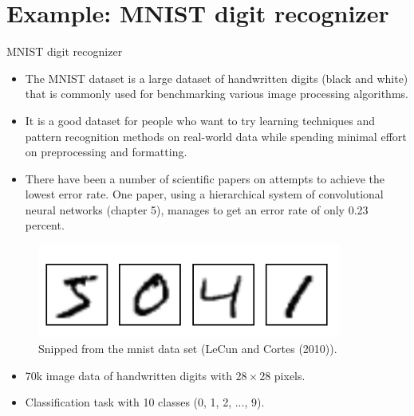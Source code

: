 \section{Example: MNIST digit recognizer}
\begin{vbframe}{MNIST digit recognizer}
  \begin{itemize}
    \item The MNIST dataset is a large dataset of handwritten digits (black and white) that is commonly used for benchmarking various image processing algorithms.
    \item It is a good dataset for people who want to try learning techniques and pattern recognition methods on real-world data while spending minimal effort on preprocessing and formatting.
    \item  There have been a number of scientific papers on attempts to achieve the lowest error rate. One paper, using a hierarchical system of convolutional neural networks (chapter 5), manages to get an error rate of only 0.23 percent.
  \end{itemize}

\framebreak
  \begin{figure}
    \centering
      \includegraphics[width=10cm]{figure/mnist.png}
      \caption{Snipped from the mnist data set (LeCun and Cortes (2010)).}
  \end{figure}
  \begin{itemize}
    \item 70k image data of handwritten digits with $28 \times 28$ pixels.
    \item Classification task with 10 classes (0, 1, 2, ..., 9).
  \end{itemize}




\end{vbframe}
